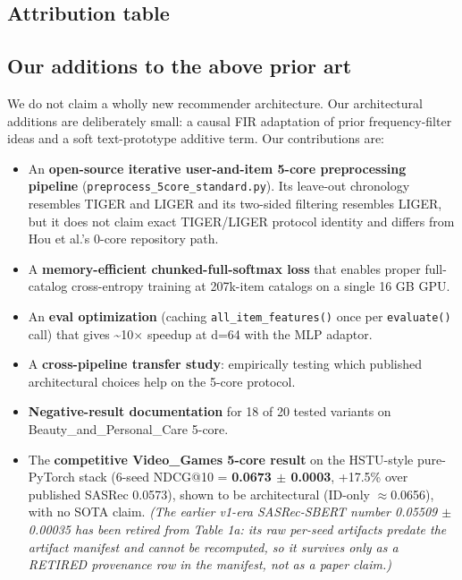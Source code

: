 \subsection{Attribution table}\label{sec:2.1}




\subsection{Our additions to the above prior art}\label{sec:2.2}

We do not claim a wholly new recommender architecture. Our architectural additions are deliberately small: a causal FIR adaptation of prior frequency-filter ideas and a soft text-prototype additive term. Our contributions are:

\begin{itemize}
\tightlist
\item
  An \textbf{open-source iterative user-and-item 5-core preprocessing pipeline} (\texttt{preprocess\_5core\_\allowbreak standard.py}). Its leave-out chronology resembles TIGER and LIGER and its two-sided filtering resembles LIGER, but it does not claim exact TIGER/LIGER protocol identity and differs from Hou et al.'s 0-core repository path.
\item
  A \textbf{memory-efficient chunked-full-softmax loss} that enables proper full-catalog cross-entropy training at 207k-item catalogs on a single 16 GB GPU.
\item
  An \textbf{eval optimization} (caching \texttt{all\_item\_features()} once per \texttt{evaluate()} call) that gives \textasciitilde10\ensuremath{\times} speedup at d=64 with the MLP adaptor.
\item
  A \textbf{cross-pipeline transfer study}: empirically testing which published architectural choices help on the 5-core protocol.
\item
  \textbf{Negative-result documentation} for 18 of 20 tested variants on Beauty\_and\_\allowbreak Personal\_Care 5-core.
\item
  The \textbf{competitive Video\_Games 5-core result} on the HSTU-style pure-PyTorch stack (6-seed NDCG@10 = \textbf{0.0673 \ensuremath{\pm} 0.0003}, +17.5\% over published SASRec 0.0573), shown to be architectural (ID-only \ensuremath{\approx}0.0656), with no SOTA claim. \emph{(The earlier v1-era SASRec-SBERT number 0.05509 \ensuremath{\pm} 0.00035 has been retired from Table 1a: its raw per-seed artifacts predate the artifact manifest and cannot be recomputed, so it survives only as a RETIRED provenance row in the manifest, not as a paper claim.)}

\end{itemize}

